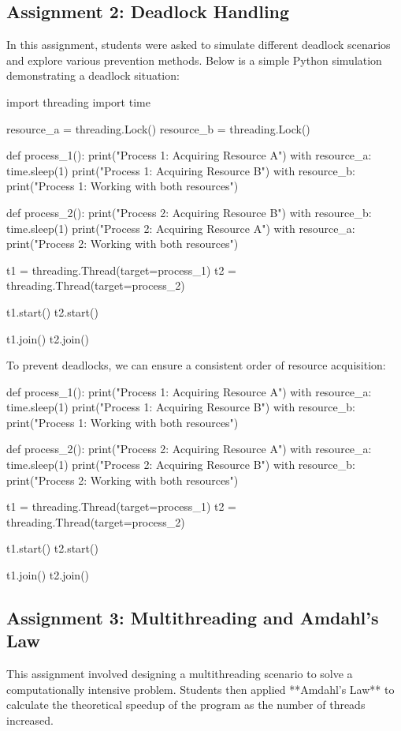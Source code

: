 \documentclass[12pt]{article}
\begin{document}
\begin{itemize}
\subsection{Assignment 2: Deadlock Handling}
In this assignment, students were asked to simulate different deadlock scenarios and explore various prevention methods. Below is a simple Python simulation demonstrating a deadlock situation:

\begin{python}
import threading
import time

resource_a = threading.Lock()
resource_b = threading.Lock()

def process_1():
    print("Process 1: Acquiring Resource A")
    with resource_a:
        time.sleep(1)  
        print("Process 1: Acquiring Resource B")
        with resource_b:
            print("Process 1: Working with both resources")

def process_2():
    print("Process 2: Acquiring Resource B")
    with resource_b:
        time.sleep(1)  
        print("Process 2: Acquiring Resource A")
        with resource_a:
            print("Process 2: Working with both resources")


t1 = threading.Thread(target=process_1)
t2 = threading.Thread(target=process_2)


t1.start()
t2.start()

t1.join()
t2.join()
\end{python}

To prevent deadlocks, we can ensure a consistent order of resource acquisition:

\begin{python}
def process_1():
    print("Process 1: Acquiring Resource A")
    with resource_a:
        time.sleep(1)  
        print("Process 1: Acquiring Resource B")
        with resource_b:
            print("Process 1: Working with both resources")

def process_2():
    print("Process 2: Acquiring Resource A")
    with resource_a:
        time.sleep(1) 
        print("Process 2: Acquiring Resource B")
        with resource_b:
            print("Process 2: Working with both resources")


t1 = threading.Thread(target=process_1)
t2 = threading.Thread(target=process_2)

t1.start()
t2.start()


t1.join()
t2.join()
\end{python}

\subsection{Assignment 3: Multithreading and Amdahl's Law}
This assignment involved designing a multithreading scenario to solve a computationally intensive problem. Students then applied **Amdahl's Law** to calculate the theoretical speedup of the program as the number of threads increased.


\end{itemize}
\end{document}
